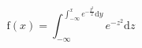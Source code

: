 \begin{equation}
  \mathrm{f}(x)=\int_{-\infty}^{\int_{-\infty}^x
    e^{-\frac{y^2}{2}}\mathrm{d}{y}}e^{-z^2}\mathrm{d}z
\end{equation}
